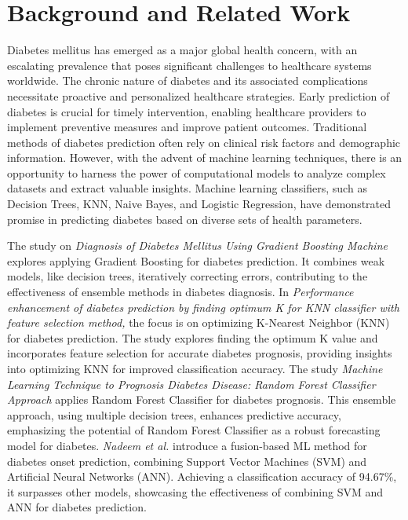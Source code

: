 \documentclass[11pt]{article}
\begin{document}
\section{Background and Related Work}

  Diabetes mellitus has emerged as a major global health concern, with an escalating prevalence that poses significant challenges to healthcare systems worldwide. The chronic nature of diabetes and its associated complications necessitate proactive and personalized healthcare strategies. Early prediction of diabetes is crucial for timely intervention, enabling healthcare providers to implement preventive measures and improve patient outcomes. Traditional methods of diabetes prediction often rely on clinical risk factors and demographic information. However, with the advent of machine learning techniques, there is an opportunity to harness the power of computational models to analyze complex datasets and extract valuable insights. Machine learning classifiers, such as Decision Trees, KNN, Naive Bayes, and Logistic Regression, have demonstrated promise in predicting diabetes based on diverse sets of health parameters.
  


The study on \textit{Diagnosis of Diabetes Mellitus Using Gradient Boosting Machine}\cite{paper1} explores applying Gradient Boosting for diabetes prediction. It combines weak models, like decision trees, iteratively correcting errors, contributing to the effectiveness of ensemble methods in diabetes diagnosis. In \textit{Performance enhancement of diabetes prediction by finding optimum K for KNN classifier with feature selection method,}\cite{paper2} the focus is on optimizing K-Nearest Neighbor (KNN) for diabetes prediction. The study explores finding the optimum K value and incorporates feature selection for accurate diabetes prognosis, providing insights into optimizing KNN for improved classification accuracy. The study \textit{Machine Learning Technique to Prognosis Diabetes Disease: Random Forest Classifier Approach}\cite{paper3} applies Random Forest Classifier for diabetes prognosis. This ensemble approach, using multiple decision trees, enhances predictive accuracy, emphasizing the potential of Random Forest Classifier as a robust forecasting model for diabetes. \textit{Nadeem et al.}\cite{paper4} introduce a fusion-based ML method for diabetes onset prediction, combining Support Vector Machines (SVM) and Artificial Neural Networks (ANN). Achieving a classification accuracy of 94.67\%, it surpasses other models, showcasing the effectiveness of combining SVM and ANN for diabetes prediction.
\end{document}
